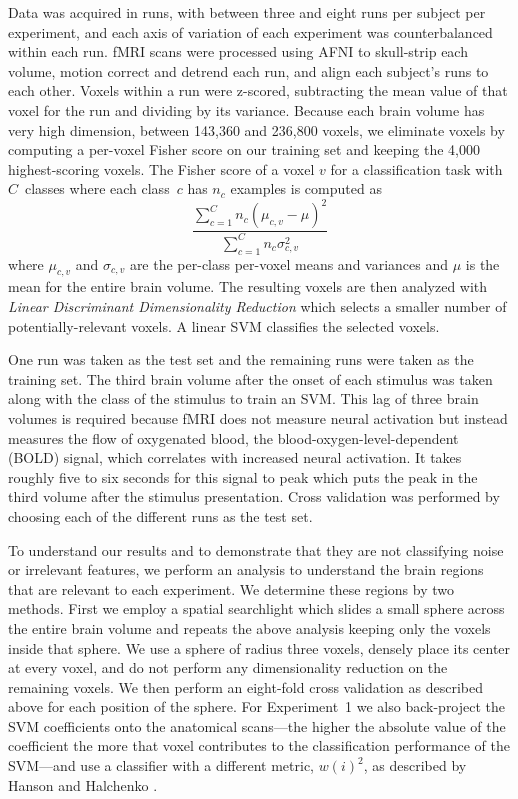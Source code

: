 Data was acquired in runs, with between three and eight runs per subject per
experiment, and each axis of variation of each experiment was counterbalanced
within each run.
%
fMRI scans were processed using AFNI \citep{cox1996afni} to skull-strip each
volume, motion correct and detrend each run, and align each subject's runs to
each other.
%
Voxels within a run were z-scored, subtracting the mean value of that voxel for
the run and dividing by its variance.
%
Because each brain volume has very high dimension, between 143,360 and
236,800 voxels, we eliminate voxels by computing a per-voxel Fisher score on
our training set and keeping the 4,000 highest-scoring voxels.
%
The Fisher score of a voxel $v$ for a classification task with $C$~classes
where each class~$c$ has $n_c$ examples is computed as
%
\begin{equation}
  \frac{\displaystyle\sum_{c=1}^C n_c(\mu_{c,v}-\mu)^2}
  {\displaystyle\sum_{c=1}^C n_c \sigma_{c,v}^2}
\end{equation}
%
where $\mu_{c,v}$ and $\sigma_{c,v}$ are the per-class per-voxel means and
variances and $\mu$ is the mean for the entire brain volume.
%
The resulting voxels are then analyzed with \emph{Linear Discriminant
  Dimensionality Reduction} \cite{gu2011linear} which selects a smaller number
of potentially-relevant voxels.
%
A linear SVM classifies the selected voxels.

One run was taken as the test set and the remaining runs were taken as the
training set.
%
The third brain volume after the onset of each stimulus was taken along with
the class of the stimulus to train an SVM.\@
%
This lag of three brain volumes is required because fMRI does not measure
neural activation but instead measures the flow of oxygenated blood, the
blood-oxygen-level-dependent (BOLD) signal, which correlates with increased
neural activation.
%
It takes roughly five to six seconds for this signal to peak which puts the
peak in the third volume after the stimulus presentation.
%
Cross validation was performed by choosing each of the different runs as the
test set.

To understand our results and to demonstrate that they are not classifying
noise or irrelevant features, we perform an analysis to understand the brain
regions that are relevant to each experiment.
%
We determine these regions by two methods.
%
First we employ a spatial searchlight \citep{kriegeskorte2006information} which
slides a small sphere across the entire brain volume and repeats the above
analysis keeping only the voxels inside that sphere.
%
We use a sphere of radius three voxels, densely place its center at every
voxel, and do not perform any dimensionality reduction on the remaining voxels.
%
We then perform an eight-fold cross validation as described above for each
position of the sphere.
%
For Experiment~1 we also back-project the SVM coefficients onto the
anatomical scans---the higher the absolute value of the coefficient
the more that voxel contributes to the classification performance of
the SVM---and use a classifier with a different metric, $w(i)^2$, as
described by Hanson and Halchenko \cite{hanson2009}.

